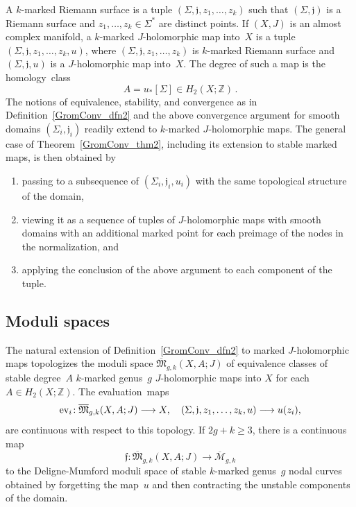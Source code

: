 \documentclass[11pt]{article}
\numberwithin{equation}{section}
\theoremstyle{definition}
\def\ov#1{\overline{#1}}
\def\sf#1{\textsf{#1}}
\def\lra{\longrightarrow}
\def\ff{\mathfrak f}
\def\fj{\mathfrak j}
\def\cM{\mathcal M}
\def\fM{\mathfrak M}
\def\Z{{\mathbb Z}}
\def\Si{\Sigma}
\def\ev{\textnormal{ev}}
\begin{document}
\noindent
A \sf{$k$-marked Riemann surface} is a tuple $(\Si,\fj,z_1,\ldots,z_k)$
such that $(\Si,\fj)$ is a Riemann surface and $z_1,\ldots,z_k\!\in\!\Si^*$ 
are distinct points.
If $(X,J)$ is an almost complex manifold, 
a \sf{$k$-marked \hbox{$J$-holomorphic} map} into~$X$ is a tuple $(\Si,\fj,z_1,\ldots,z_k,u)$,
where $(\Si,\fj,z_1,\ldots,z_k)$ is $k$-marked Riemann surface
and  $(\Si,\fj,u)$ is a $J$-holomorphic map into~$X$.
The \sf{degree} of such a map is the homology~class
$$A=u_*[\Si]\in H_2(X;\Z)\,.$$
The notions of equivalence, stability, and convergence as in Definition~\ref{GromConv_dfn2}
and the above convergence argument for smooth domains $(\Si_i,\fj_i)$
readily extend to $k$-marked $J$-holomorphic maps.
The general case of Theorem~\ref{GromConv_thm2}, including its extension to stable marked maps, 
is then obtained by 
\begin{enumerate}[label=$\bullet$,leftmargin=*]

\item passing to a subsequence of $(\Si_i,\fj_i,u_i)$ with the same
topological structure of the domain,

\item viewing it as a sequence of tuples of $J$-holomorphic maps with smooth domains
with an additional marked point for each preimage of the nodes in the normalization, and 

\item applying the conclusion of the above argument to each component of the tuple.

\end{enumerate}


\subsection{Moduli spaces}
\label{ModSp_subs}

\noindent
The natural extension of Definition~\ref{GromConv_dfn2} to marked $J$-holomorphic maps
topologizes
the moduli space $\ov\fM_{g,k}(X,A;J)$ of equivalence classes
of stable  degree~$A$ $k$-marked genus~$g$ $J$-holomorphic maps into $X$ 
for each $A\!\in\!H_2(X;\Z)$.
The evaluation~maps
$$\ev_i\!:\ov\fM_{g,k}(X,A;J)\lra X, \quad
(\Si,\fj,z_1,\ldots,z_k,u)\lra u(z_i),$$
are continuous with respect to this topology.
If $2g\!+\!k\!\ge\!3$, there is a continuous map
$$\ff\!:\ov\fM_{g,k}(X,A;J)\lra \ov\cM_{g,k}$$
to the Deligne-Mumford moduli space of stable $k$-marked genus~$g$ nodal curves
obtained by forgetting the map~$u$ and then contracting the unstable components 
of the domain.\\
\end{document}
